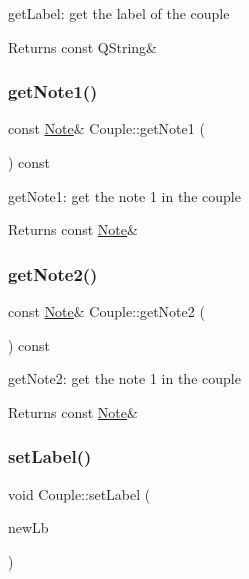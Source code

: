 get\+Label\+: get the label of the couple 

\begin{DoxyReturn}{Returns}
const Q\+String\& 
\end{DoxyReturn}
\mbox{\label{class_couple_ab1e111ccd47d953bce5a485a40f6e7d2}} 
\subsubsection{\texorpdfstring{get\+Note1()}{getNote1()}}
{\footnotesize\ttfamily const \hyperlink{class_note}{Note}\& Couple\+::get\+Note1 (\begin{DoxyParamCaption}{ }\end{DoxyParamCaption}) const\hspace{0.3cm}{\ttfamily [inline]}}



get\+Note1\+: get the note 1 in the couple 

\begin{DoxyReturn}{Returns}
const \hyperlink{class_note}{Note}\& 
\end{DoxyReturn}
\mbox{\label{class_couple_ad3d28199ad0170f65c4564a910167ed6}} 
\subsubsection{\texorpdfstring{get\+Note2()}{getNote2()}}
{\footnotesize\ttfamily const \hyperlink{class_note}{Note}\& Couple\+::get\+Note2 (\begin{DoxyParamCaption}{ }\end{DoxyParamCaption}) const\hspace{0.3cm}{\ttfamily [inline]}}



get\+Note2\+: get the note 1 in the couple 

\begin{DoxyReturn}{Returns}
const \hyperlink{class_note}{Note}\& 
\end{DoxyReturn}
\mbox{\label{class_couple_aed2c64b89da0544329d98eb5298d984d}} 
\subsubsection{\texorpdfstring{set\+Label()}{setLabel()}}
{\footnotesize\ttfamily void Couple\+::set\+Label (\begin{DoxyParamCaption}\item[{Q\+String \&}]{new\+Lb }\end{DoxyParamCaption})\hspace{0.3cm}{\ttfamily [inline]}}




